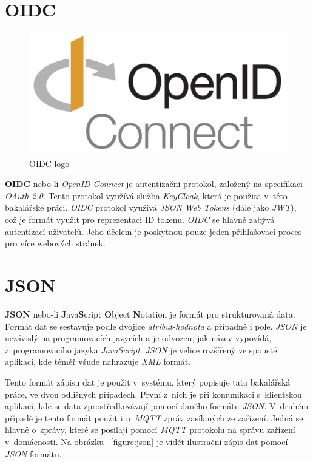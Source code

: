 \newpage

\section{OIDC}
\label{app_prostredi:oidc}

\begin{figure}[hbt]
  \centering
  \includegraphics[width=.35 \linewidth]{obrazky-figures/OIDC.png}
  \caption{OIDC logo}
\end{figure}

\textbf{OIDC} nebo-li \emph{OpenID Connect} je autentizační protokol, založený na specifikaci \emph{OAuth 2.0}. Tento protokol využívá služba \emph{KeyCloak}, která je použita v~této bakalářské práci.
\emph{OIDC} protokol využívá \emph{JSON Web Tokens} (dále jako \emph{JWT}), což je formát využit pro reprezentaci ID tokenu.
\emph{OIDC} se hlavně zabývá autentizací uživatelů.
Jeho účelem je poskytnou pouze jeden přihlašovací proces pro více webových stránek.~\cite{terminy:oidc}

\section{JSON}
\label{terminy:json}

\textbf{JSON} nebo-li \textbf{J}ava\textbf{S}cript \textbf{O}bject \textbf{N}otation je formát pro strukturovaná data.
Formát dat se sestavuje podle dvojice \emph{atribut-hodnota} a případně i pole.
\emph{JSON} je nezávislý na programovacích jazycích a je odvozen, jak název vypovídá, z~programovacího jazyka \emph{JavaScript}.
\emph{JSON} je velice rozšířený ve spoustě aplikací, kde téměř všude nahrazuje \emph{XML} formát.

Tento formát zápisu dat je použit v~systému, který popisuje tato bakalářská práce, ve dvou odlišných případech.
První z~nich je při komunikaci s~klientskou aplikací, kde se data zprostředkovávají pomocí daného formátu \emph{JSON}.
V~druhém případě je tento formát použit i u~\emph{MQTT} zpráv zasílaných ze zařízení.
Jedná se hlavně o~zprávy, které se posílají pomocí \emph{MQTT} protokolu na správu zařízení v~domácnosti.
Na obrázku ~\ref{figure:json} je vidět ilustrační zápis dat pomocí \emph{JSON} formátu.

